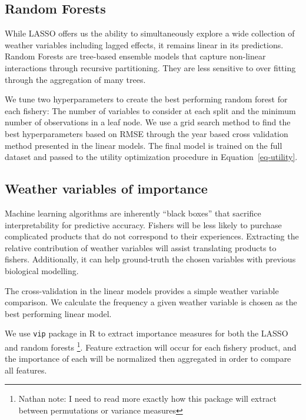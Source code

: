 \documentclass[
  letterpaper,
  DIV=11,
  numbers=noendperiod]{scrartcl}
\begin{document}
\hypertarget{random-forests}{%
\subsection{Random Forests}\label{random-forests}}

While LASSO offers us the ability to simultaneously explore a wide
collection of weather variables including lagged effects, it remains
linear in its predictions. Random Forests are tree-based ensemble models
that capture non-linear interactions through recursive partitioning.
They are less sensitive to over fitting through the aggregation of many
trees.

We tune two hyperparameters to create the best performing random forest
for each fishery: The number of variables to consider at each split and
the minimum number of observations in a leaf node. We use a grid search
method to find the best hyperparameters based on RMSE through the year
based cross validation method presented in the linear models. The final
model is trained on the full dataset and passed to the utility
optimization procedure in Equation~\ref{eq-utility}.

\hypertarget{weather-variables-of-importance}{%
\subsection{Weather variables of
importance}\label{weather-variables-of-importance}}

Machine learning algorithms are inherently ``black boxes'' that
sacrifice interpretability for predictive accuracy. Fishers will be less
likely to purchase complicated products that do not correspond to their
experiences. Extracting the relative contribution of weather variables
will assist translating products to fishers. Additionally, it can help
ground-truth the chosen variables with previous biological modelling.

The cross-validation in the linear models provides a simple weather
variable comparison. We calculate the frequency a given weather variable
is chosen as the best performing linear model.

We use \texttt{vip} package in R to extract importance measures for both
the LASSO and random forests \footnote{Nathan note: I need to read more
  exactly how this package will extract between permutations or variance
  measures}. Feature extraction will occur for each fishery product, and
the importance of each will be normalized then aggregated in order to
compare all features.
\end{document}
